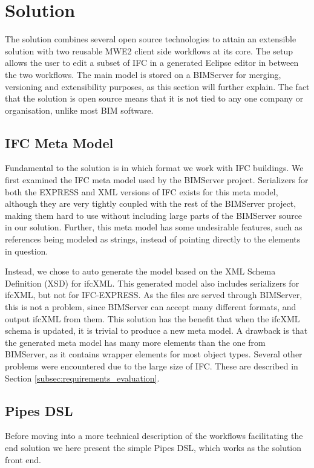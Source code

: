 \section{Solution}
\label{sec:solution}
The solution combines several open source technologies to attain an extensible solution with two reusable MWE2 client side workflows at its core. The setup allows the user to edit a subset of IFC in a generated Eclipse editor in between the two workflows. The main model is stored on a BIMServer for merging, versioning and extensibility purposes, as this section will further explain. The fact that the solution is open source means that it is not tied to any one company or organisation, unlike most BIM software.

\subsection{IFC Meta Model}
\label{subsec:ifc_meta_model}
Fundamental to the solution is in which format we work with IFC buildings. We first examined the IFC meta model used by the BIMServer project. Serializers for both the EXPRESS and XML versions of IFC exists for this meta model, although they are very tightly coupled with the rest of the BIMServer project, making them hard to use without including large parts of the BIMServer source in our solution. Further, this meta model has some undesirable features, such as references being modeled as strings, instead of pointing directly to the elements in question.

Instead, we chose to auto generate the model based on the XML Schema Definition (XSD) for ifcXML. This generated model also includes serializers for ifcXML, but not for IFC-EXPRESS. As the files are served through BIMServer, this is not a problem, since BIMServer can accept many different formats, and output ifcXML from them. This solution has the benefit that when the ifcXML schema is updated, it is trivial to produce a new meta model. A drawback is that the generated meta model has many more elements than the one from BIMServer, as it contains wrapper elements for most object types. Several other problems were encountered due to the large size of IFC. These are described in Section \ref{subsec:requirements_evaluation}.

\subsection{Pipes DSL}
\label{subsec:pipes_dsl}
Before moving into a more technical description of the workflows facilitating the end solution we here present the simple Pipes DSL, which works as the solution front end.

